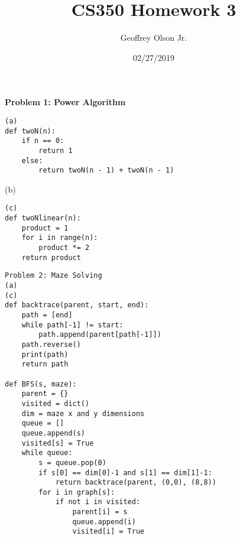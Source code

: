 \documentclass[12pt]{article}
\title{CS350 Homework 3}
\author{Geoffrey Olson Jr.}
\date{02/27/2019}
\begin{document}
\maketitle
\textbf{Problem 1: Power Algorithm}
\begin{lstlisting}
(a)
def twoN(n):
    if n == 0:
        return 1
    else:
        return twoN(n - 1) + twoN(n - 1)
\end{lstlisting}
(b)

\begin{lstlisting}
(c)
def twoNlinear(n):
    product = 1
    for i in range(n):
        product *= 2
    return product
\end{lstlisting}

\begin{lstlisting}
Problem 2: Maze Solving
(a)
(c)
def backtrace(parent, start, end):
    path = [end]
    while path[-1] != start:
        path.append(parent[path[-1]])
    path.reverse()
    print(path)
    return path

def BFS(s, maze):
    parent = {}
    visited = dict()
    dim = maze x and y dimensions
    queue = []
    queue.append(s)
    visited[s] = True
    while queue:
        s = queue.pop(0)
        if s[0] == dim[0]-1 and s[1] == dim[1]-1:
            return backtrace(parent, (0,0), (8,8))
        for i in graph[s]:
            if not i in visited:
                parent[i] = s
                queue.append(i)
                visited[i] = True
\end{lstlisting}
\end{document}
